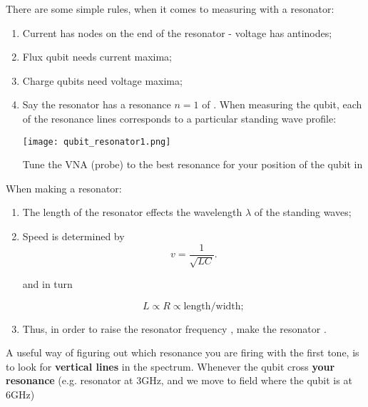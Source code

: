 There are  some simple  rules, when  it comes  to measuring
with a resonator:

\begin{framed}\noindent
  \begin{enumerate}
  \item Current  has nodes  on the end  of the  resonator -
    voltage has antinodes;
  \item Flux qubit needs current maxima;
  \item Charge qubits need voltage maxima;
  \item Say  the resonator  has a  resonance $ n  = 1  $ of
    .  When measuring the  qubit, each of the
    resonance  lines corresponds  to a  particular standing
    wave profile:
    \begin{center}
      \texttt{[image: qubit\_resonator1.png]}
    \end{center}
    \noindent Tune  the VNA  (probe) to the  best resonance
    for your position of the qubit in 
  \end{enumerate}
\end{framed}

\begin{framed}\noindent
  When making a resonator:
  \begin{enumerate}
  \item The length of  the resonator effects the wavelength
    $\lambda$ of the standing waves;
    
  \item Speed is determined by
    \begin{equation}
      \label{eq:resonator2}
      v = \frac{1}{\sqrt{LC}}.
    \end{equation}

    \noindent and in turn

    \begin{equation}
      \label{eq:resonator3}
      L      \propto  R \propto  \text{length}/\text{width};
    \end{equation}
    
  \item  Thus, in  order to  raise the  resonator frequency
    , make  the resonator
    .
  \end{enumerate}
\end{framed}

\noindent A useful way of  figuring out which resonance you
are  firing   with  the   first  tone,   is  to   look  for
\textbf{vertical  lines}  in  the spectrum.   Whenever  the
qubit  cross \textbf{your  resonance}  (e.g.  resonator  at
3GHz, and  we move  to field  where the  qubit is  at 6GHz)

